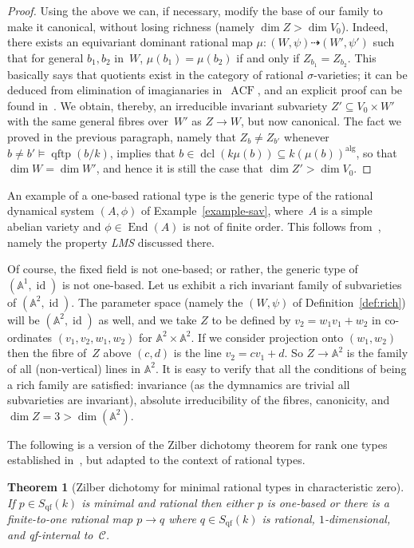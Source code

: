 \documentclass[\DocOpts]{amsart}
\newtheorem{theorem}{Theorem}[section]
\theoremstyle{definition}
\def\endo{\operatorname{End}}
\def\acf{\operatorname{ACF}}
\def\qftp{\operatorname{qftp}}
\def\qf{\operatorname{qf}}
\def\dcl{\operatorname{dcl}}
\def\alg{{\operatorname{alg}}}
\def\C{\mathcal{C}}
\renewcommand{\AA}{\mathbb{A}}
\providecommand{\id}{\operatorname{id}}
\newcommand{\<}{\langle}
\renewcommand{\>}{\rangle}
\newcommand{\dto}{\dashrightarrow}
\begin{document}
\begin{proof}
Using the above we can, if necessary, modify the base of our family to make it canonical, without losing richness (namely $\dim Z>\dim V_0$).
Indeed, there exists an equivariant dominant rational map $\mu:(W,\psi)\dto(W',\psi')$ such that for general $b_1,b_2$ in~$W$, $\mu(b_1)=\mu(b_2)$ if and only if $Z_{b_1}=Z_{b_2}$.
This basically says that quotients exist in the category of rational $\sigma$-varieties; it can be deduced from elimination of imagianaries in~$\acf$, and an explicit proof can be found in~\cite[Proposition~3.2]{qfint}.
We obtain, thereby, an irreducible invariant subvariety $Z'\subseteq V_0\times W'$ with the same general fibres over~$W'$ as $Z\to W$, but now canonical.
The fact we proved in the previous paragraph, namely that  $Z_b\neq Z_{b'}$ whenever $b\neq b'\models\qftp(b/k)$, implies that $b\in\dcl(k\mu(b))\subseteq k(\mu(b))^{\alg}$, so that $\dim W=\dim W'$, and hence it is still the case that $\dim Z'>\dim V_0$.
\end{proof}

An example of a one-based rational type is the generic type of the rational dynamical system $(A,\phi)$ of  Example~\ref{example-sav}, where~$A$ is a simple abelian variety and $\phi\in \endo(A)$ is not of finite order.
This follows from~\cite{mm}, namely the property \emph{LMS} discussed there.

Of course,  the fixed field is not one-based; or rather, the generic type of $(\AA^1,\id)$ is not one-based.
Let us exhibit a rich invariant family of subvarieties of $(\AA^2,\id)$.
The parameter space (namely the $(W,\psi)$ of Definition~\ref{def:rich}) will be $(\AA^2,\id)$ as well, and we take $Z$ to be defined by $v_2=w_1v_1+w_2$ in co-ordinates $(v_1,v_2,w_1,w_2)$ for $\AA^2\times\AA^2$.
If we consider projection onto $(w_1,w_2)$ then the fibre of~$Z$ above $(c,d)$ is the line $v_2=cv_1+d$.
So $Z\to\AA^2$ is the family of all (non-vertical) lines in $\AA^2$.
It is easy to verify that all the conditions of being a rich family are satisfied: invariance (as the dymnamics are trivial all subvarieties are invariant), absolute irreducibility of the fibres, canonicity, and $\dim Z=3>\dim(\AA^2)$.

The following is a version of the Zilber dichotomy theorem for rank one types established in~\cite{acfa}, but adapted to the context of rational types.

\begin{theorem}[Zilber dichotomy for minimal rational types in characteristic 
  zero]\label{thm:zd}
If
$p\in S_{\qf}(k)$ is minimal and rational then either $p$ is one-based or there is a finite-to-one 
rational map $p\to q$ where $q\in S_{\qf}(k)$ is rational, $1$-dimensional, and qf-internal to~$\C$.
\end{theorem}
\end{document}
